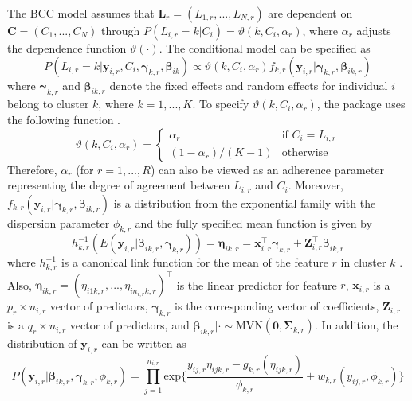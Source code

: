 The BCC model assumes that $\boldsymbol{L}_{r} = (L_{1,r},...,L_{N,r})$ are dependent on $\boldsymbol{C} = (C_1,...,C_N)$ through $P(L_{i,r}=k|C_i) = \vartheta(k,C_i, \alpha_r)$, where $\alpha_r$ adjusts the dependence function $\vartheta(\cdot)$. The conditional model can be specified as 
\begin{equation}
P(L_{i,r}=k|\boldsymbol{y}_{i,r},C_i,\boldsymbol{\gamma}_{k,r}, \boldsymbol{\beta}_{ik}) \propto\vartheta(k,C_i,\alpha_r)f_{k,r}(\boldsymbol{y}_{i,r}|\boldsymbol{\gamma}_{k,r}, \boldsymbol{\beta}_{ik,r})
\end{equation}
where $\boldsymbol{\gamma}_{k,r}$ and $\boldsymbol{\beta}_{ik,r}$ denote the fixed effects and random effects for individual $i$ belong to cluster $k$, where $k=1,...,K$. To specify $\vartheta(k,C_i,\alpha_r)$, the package uses the following function \citep{Lock2013}. 
\begin{equation}
  \vartheta(k,C_i,\alpha_r)  =
    \begin{cases}
      \alpha_r & \text{if } C_i = L_{i,r}\\
      (1- \alpha_r)/(K-1) & \text{otherwise}
    \end{cases}       
\end{equation}
Therefore, $\alpha_r$ (for $r = 1,...,R$) can also be viewed as an adherence parameter representing the degree of agreement between $L_{i,r}$ and $C_i$. Moreover, $ f_{k,r}(\boldsymbol{y}_{i,r}|\boldsymbol{\gamma}_{k,r}, \boldsymbol{\beta}_{ik,r})$ is a distribution from the exponential family with the dispersion parameter $\phi_{k,r}$ and the fully specified mean function is given by 
\begin{equation}
h^{-1}_{k,r}(E(\boldsymbol{y}_{i,r}|\boldsymbol{\beta}_{ik,r},\boldsymbol{\gamma}_{k,r})) = \boldsymbol{\eta}_{ik,r} = \boldsymbol{x}_{i,r}^\top\boldsymbol{\gamma}_{k,r} +  \boldsymbol{Z}_{i,r}^\top\boldsymbol{\beta}_{ik,r}
\end{equation}
where $h_{k,r}^{-1}$  is a canonical link function for the mean of the feature $r$ in cluster $k$ . Also, $\boldsymbol{\eta}_{ik,r} = (\eta_{i1k,r},...,\eta_{in_{i,r}k,r})^\top$ is the linear predictor for feature $r$, $\boldsymbol{x}_{i,r}$ is a $p_r\times n_{i,r}$ vector of predictors,  $\boldsymbol{\gamma}_{k,r}$ is the corresponding vector of coefficients, $\boldsymbol{Z}_{i,r}$ is a $q_r\times n_{i,r}$ vector of predictors, and $\boldsymbol{\beta}_{ik,r}|\cdot \sim \text{MVN}(\boldsymbol{0},\boldsymbol{\Sigma}_{k,r})$. In addition, the distribution of $\boldsymbol{y}_{i,r}$ can be written as
\begin{equation}
P(\boldsymbol{y}_{i,r}|\boldsymbol{\beta}_{ik,r},\boldsymbol{\gamma}_{k,r}, \phi_{k,r}) = \prod_{j=1}^{n_{i,r}} \text{exp}\bigg\{ \frac{y_{ij,r}\eta_{ijk,r} - g_{k,r}(\eta_{ijk,r})}{\phi_{k,r}} + w_{k,r}(y_{ij,r},\phi_{k,r}) \bigg\} 
\end{equation}
